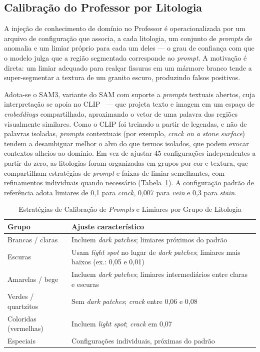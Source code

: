 \documentclass[10pt,conference]{IEEEtran}
\begin{document}
\subsection{Calibração do Professor por Litologia}

A injeção de conhecimento de domínio no Professor é operacionalizada por um arquivo de configuração que associa, a cada litologia, um conjunto de \textit{prompts} de anomalia e um limiar próprio para cada um deles --- o grau de confiança com que o modelo julga que a região segmentada corresponde ao \textit{prompt}. A motivação é direta: um limiar adequado para realçar fissuras em um mármore branco tende a super-segmentar a textura de um granito escuro, produzindo falsos positivos.

Adota-se o SAM3, variante do SAM com suporte a \textit{prompts} textuais abertos, cuja interpretação se apoia no CLIP~\cite{clip_radford2021} --- que projeta texto e imagem em um espaço de \textit{embeddings} compartilhado, aproximando o vetor de uma palavra das regiões visualmente similares. Como o CLIP foi treinado a partir de legendas, e não de palavras isoladas, \textit{prompts} contextuais (por exemplo, \textit{crack on a stone surface}) tendem a desambiguar melhor o alvo do que termos isolados, que podem evocar contextos alheios ao domínio. Em vez de ajustar 45 configurações independentes a partir do zero, as litologias foram organizadas em grupos por cor e textura, que compartilham estratégias de \textit{prompt} e faixas de limiar semelhantes, com refinamentos individuais quando necessário (Tabela~\ref{tab:calibracao}). A configuração padrão de referência adota limiares de 0,1 para \textit{crack}, 0,007 para \textit{vein} e 0,3 para \textit{stain}.

\begin{table}[!t]
\renewcommand{\arraystretch}{1.2}
\caption{Estratégias de Calibração de \textit{Prompts} e Limiares por Grupo de Litologia}
\label{tab:calibracao}
\centering
\footnotesize
\begin{tabular}{|l|p{5.0cm}|}
\hline
\textbf{Grupo} & \textbf{Ajuste característico} \\
\hline
Brancas / claras & Incluem \textit{dark patches}; limiares próximos do padrão \\
\hline
Escuras & Usam \textit{light spot} no lugar de \textit{dark patches}; limiares mais baixos (ex.: 0,05 e 0,01) \\
\hline
Amarelas / bege & Incluem \textit{dark patches}; limiares intermediários entre claras e escuras \\
\hline
Verdes / quartzitos & Sem \textit{dark patches}; \textit{crack} entre 0,06 e 0,08 \\
\hline
Coloridas (vermelhas) & Incluem \textit{light spot}; \textit{crack} em 0,07 \\
\hline
Especiais & Configurações individuais, próximas do padrão \\
\hline
\end{tabular}
\end{table}
\end{document}
